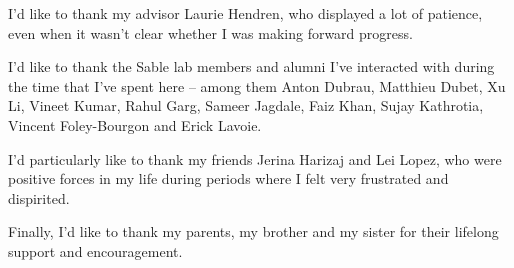I'd like to thank my advisor Laurie Hendren, who displayed a lot of patience,
even when it wasn't clear whether I was making forward progress.

I'd like to thank the Sable lab members and alumni I've interacted with during
the time that I've spent here -- among them Anton Dubrau, Matthieu Dubet, Xu Li,
Vineet Kumar, Rahul Garg, Sameer Jagdale, Faiz Khan, Sujay Kathrotia, Vincent
Foley-Bourgon and Erick Lavoie.

I'd particularly like to thank my friends Jerina Harizaj and Lei Lopez, who
were positive forces in my life during periods where I felt very frustrated and
dispirited.

Finally, I'd like to thank my parents, my brother and my sister for their
lifelong support and encouragement.
